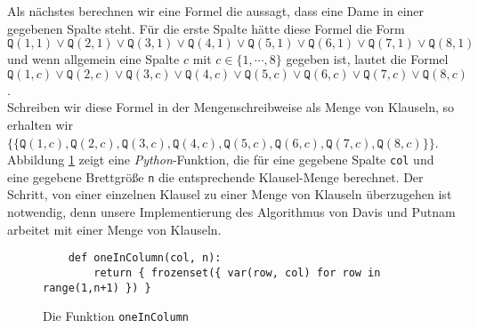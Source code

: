 Als nächstes berechnen wir eine Formel die aussagt, dass  eine Dame in einer gegebenen
Spalte steht.  Für die erste Spalte hätte diese Formel die Form 
\\[0.2cm]
\hspace*{1.3cm}
$\texttt{Q}(1,1) \vee \texttt{Q}(2,1) \vee \texttt{Q}(3,1) \vee \texttt{Q}(4,1) \vee \texttt{Q}(5,1) \vee
\texttt{Q}(6,1) \vee \texttt{Q}(7,1) \vee \texttt{Q}(8,1)$
\\[0.2cm]
und wenn allgemein eine Spalte $c$ mit $c \in \{1,\cdots,8\}$ gegeben ist, lautet die Formel
\\[0.2cm]
\hspace*{1.3cm}
$\texttt{Q}(1,c) \vee \texttt{Q}(2,c) \vee \texttt{Q}(3,c) \vee \texttt{Q}(4,c) \vee \texttt{Q}(5,c) \vee
\texttt{Q}(6,c) \vee \texttt{Q}(7,c) \vee \texttt{Q}(8,c)$.
\\[0.2cm]
Schreiben wir diese Formel in der Mengenschreibweise als Menge von Klauseln, so erhalten wir
\\[0.2cm]
\hspace*{1.3cm}
$\bigl\{ \{\texttt{Q}(1,c) , \texttt{Q}(2,c) , \texttt{Q}(3,c) , \texttt{Q}(4,c) , \texttt{Q}(5,c) ,
\texttt{Q}(6,c) , \texttt{Q}(7,c) , \texttt{Q}(8,c) \}\bigr\}$.
\\[0.2cm]
Abbildung \ref{fig:oneInColumn} zeigt eine \textsl{Python}-Funktion, die für eine gegebene Spalte
\texttt{col} und eine gegebene Brettgröße \texttt{n} die entsprechende Klausel-Menge berechnet.
Der Schritt, von einer einzelnen Klausel 
zu einer Menge von Klauseln überzugehen ist notwendig, denn unsere Implementierung des Algorithmus von
Davis und Putnam arbeitet mit einer Menge von Klauseln.

\begin{figure}[!ht]
  \centering
\begin{verbatim}
    def oneInColumn(col, n):
        return { frozenset({ var(row, col) for row in range(1,n+1) }) }
\end{verbatim}
\vspace*{-0.3cm}
  \caption{Die Funktion \texttt{oneInColumn}}
  \label{fig:oneInColumn}
\end{figure}


